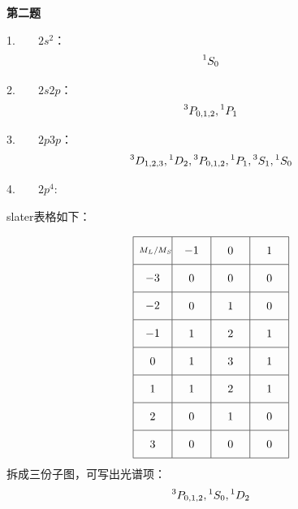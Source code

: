 \documentclass[12pt, a4paper, oneside]{ctexart}
\newcommand{\sq}[1]{%
	\parbox[c][2.4em][c]{2.4em}{\centering $#1$}%
}
\begin{document}
	\begin{center}
		\textbf{第二题}
	\end{center}
	
	1.$\qquad 2s^2$：
	$$
	\prescript{1}{}{S_0}
	$$
	
	2.$\qquad 2s2p$：
	$$
	\prescript{3}{}{P_{0,1,2}} , \prescript{1}{}{P_1}
	$$
	
	3.$\qquad 2p3p$：
	$$
	\prescript{3}{}{D_{1,2,3}} , \prescript{1}{}{D_2} , \prescript{3}{}{P_{0,1,2}} , \prescript{1}{}{P_1},
	\prescript{3}{}{S_1},\prescript{1}{}{S_0}
	$$
	
	4.$\qquad 2p^4$:
	
	slater表格如下：
	
	\[
	\begin{array}{|c|c|c|c|}
	\hline
	\sq{\scriptstyle M_L/M_S} & \sq{-1} & \sq{0} & \sq{1} \\
	\hline
	\sq{-3} & \sq{0} & \sq{0} & \sq{0} \\
	\hline
	\sq{-2} & \sq{0} & \sq{1} & \sq{0} \\
	\hline
	\sq{-1} & \sq{1} & \sq{2} & \sq{1} \\
	\hline
	\sq{0}  & \sq{1} & \sq{3} & \sq{1} \\
	\hline
	\sq{1}  & \sq{1} & \sq{2} & \sq{1} \\
	\hline
	\sq{2}  & \sq{0} & \sq{1} & \sq{0} \\
	\hline
	\sq{3}  & \sq{0} & \sq{0} & \sq{0} \\
	\hline
	\end{array}
	\]
	拆成三份子图，可写出光谱项：
	$$
	\prescript{3}{}{P_{0,1,2}} ,
	\prescript{1}{}{S_0},\prescript{1}{}{D_2}
	$$
	
\end{document}
